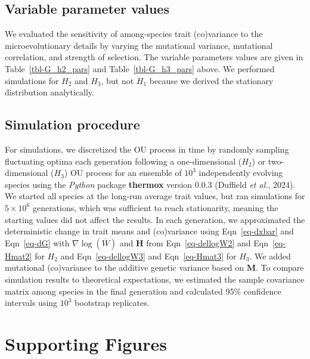\documentclass[
  letterpaper,
  DIV=11,
  numbers=noendperiod]{scrartcl}
\renewcommand{\thesection}{Note S\arabic{section}}
\begin{document}
\subsection{Variable parameter values}\label{variable-parameter-values}

We evaluated the sensitivity of among-species trait (co)variance to the
microevolutionary details by varying the mutational variance, mutational
correlation, and strength of selection. The variable parameters values
are given in Table~\ref{tbl-G_h2_pars} and Table~\ref{tbl-G_h3_pars}
above. We performed simulations for \(H_2\) and \(H_3\), but not \(H_1\)
because we derived the stationary distribution analytically.

\subsection{Simulation procedure}\label{simulation-procedure}

For simulations, we discretized the OU process in time by randomly
sampling fluctuating optima each generation following a one-dimensional
(\(H_2\)) or two-dimensional (\(H_3\)) OU process for an ensemble of
\(10^3\) independently evolving species using the \emph{Python} package
\textbf{thermox} version 0.0.3 (Duffield \emph{et al.}, 2024). We
started all species at the long-run average trait values, but ran
simulations for \(5 \times 10^6\) generations, which was sufficient to
reach stationarity, meaning the starting values did not affect the
results. In each generation, we approximated the deterministic change in
trait means and (co)variance using Eqn~\ref{eq-dxbar} and
Eqn~\ref{eq-dG} with \(\nabla \log \left( \overline{W} \right)\) and
\(\mathbf{H}\) from Eqn~\ref{eq-dellogW2} and Eqn~\ref{eq-Hmat2} for
\(H_2\) and Eqn~\ref{eq-dellogW3} and Eqn~\ref{eq-Hmat3} for \(H_3\). We
added mutational (co)variance to the additive genetic variance based on
\(\mathbf{M}\). To compare simulation results to theoretical
expectations, we estimated the sample covariance matrix among species in
the final generation and calculated 95\% confidence intervals using
\(10^3\) bootstrap replicates.

  \newpage
  \renewcommand{\thesection}{}

\section{Supporting Figures}\label{sec-figures}
\end{document}

